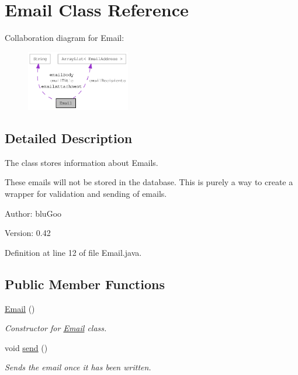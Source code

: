 \hypertarget{classEmail}{
\section{Email Class Reference}
\label{classEmail}
}
Collaboration diagram for Email:\nopagebreak
\begin{figure}[H]
\begin{center}
\leavevmode
\includegraphics[width=128pt]{classEmail__coll__graph}
\end{center}
\end{figure}


\subsection{Detailed Description}
The class stores information about Emails. 

These emails will not be stored in the database. This is purely a way to create a wrapper for validation and sending of emails.

\begin{Desc}
\item[Author:]bluGoo \end{Desc}
\begin{Desc}
\item[Version:]0.42 \end{Desc}


Definition at line 12 of file Email.java.\subsection*{Public Member Functions}
\begin{CompactItemize}
\item 
\hyperlink{classEmail_bd34d493c0a7128defb016941fc3869f}{Email} ()
\begin{CompactList}\small\item\em Constructor for \hyperlink{classEmail}{Email} class. \item\end{CompactList}\item 
void \hyperlink{classEmail_6ca0324ce6902ef1f50007e7ffc91b58}{send} ()
\begin{CompactList}\small\item\em Sends the email once it has been written. \item\end{CompactList}\end{CompactItemize}
